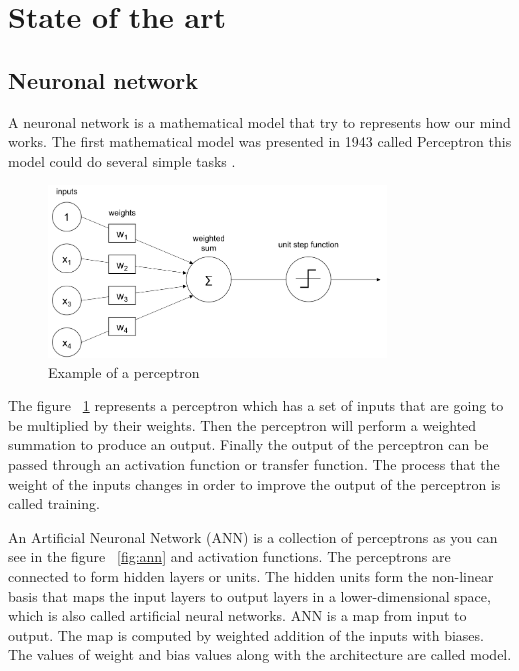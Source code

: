\newpage
\section{State of the art}
\subsection[Neuronal network]{Neuronal network}

A neuronal network is a mathematical model that try to represents how our mind works. The first mathematical model was presented in 1943 called Perceptron this model could do several simple tasks \cite{fsancho}.

\begin{figure}[H]
\centering
\includegraphics[width=0.8\textwidth]{./figures/perceptron}
\caption{Example of a perceptron \cite{rajalingappaa}}
\label{fig:perceptron}
\end{figure}
	
	
The figure ~\ref{fig:perceptron} represents a perceptron which has a set of inputs that are going to be multiplied by their weights.
Then the perceptron will perform a weighted summation to produce an output. \cite{sagar} Finally the output of the perceptron can be passed through an activation function or transfer function.\cite{rajalingappaa}
The process that the weight of the inputs changes in order to improve the output of the perceptron is called training. 

An Artificial Neuronal Network (ANN) is a collection of perceptrons as you can see in the figure ~\ref{fig:ann} and activation functions. The perceptrons are connected to form hidden layers or units. The hidden units form the non-linear basis that maps the input layers to output layers in a lower-dimensional space, which is also called artificial neural networks. ANN is a map from input to output. The map is computed by weighted addition of the inputs with biases. The values of weight and bias values along with the architecture are called model.


